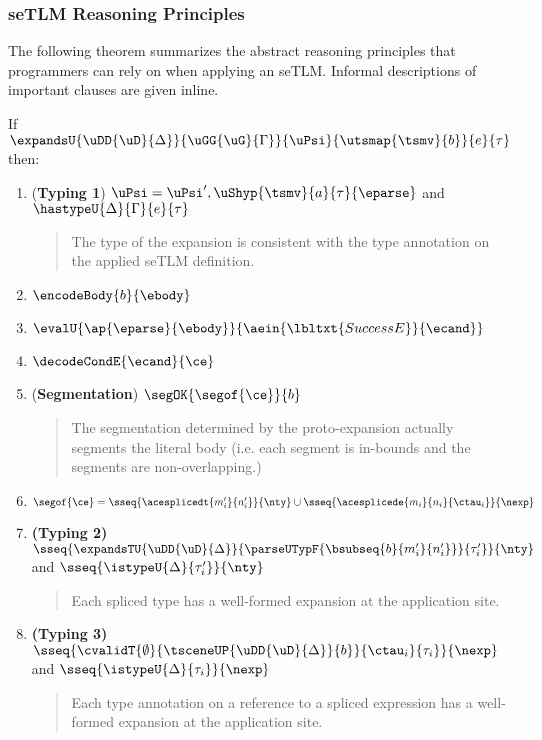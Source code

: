 \documentclass[acmsmall,10pt,review,anonymous]{acmart}\settopmatter{printfolios=true}
\begin{document}
\subsubsection{seTLM Reasoning Principles} 
The following theorem summarizes the abstract reasoning principles that programmers can rely on when applying an seTLM. Informal descriptions of important clauses are given inline. 
\begin{theorem}
If $\expandsU{\uDD{\uD}{\Delta}}{\uGG{\uG}{\Gamma}}{\uPsi}{\utsmap{\tsmv}{b}}{e}{\tau}$ then:
\begin{enumerate}[nolistsep]
\item (\textbf{Typing 1}) $\uPsi = \uPsi', \uShyp{\tsmv}{a}{\tau}{\eparse}$ and $\hastypeU{\Delta}{\Gamma}{e}{\tau}$
  \begin{quote}
     The type of the expansion is consistent with the type annotation on the applied seTLM definition.
  \end{quote}
\item $\encodeBody{b}{\ebody}$
\item $\evalU{\ap{\eparse}{\ebody}}{\aein{\lbltxt{SuccessE}}{\ecand}}$
\item $\decodeCondE{\ecand}{\ce}$
\item (\textbf{Segmentation}) $\segOK{\segof{\ce}}{b}$
        \begin{quote}
        The segmentation determined by the proto-expansion actually segments the literal body (i.e. each segment is in-bounds and the segments are non-overlapping.)
        \end{quote}
\item $\segof{\ce} = \sseq{\acesplicedt{m'_i}{n'_i}}{\nty} \cup \sseq{\acesplicede{m_i}{n_i}{\ctau_i}}{\nexp}$
\item \textbf{(Typing 2)} $\sseq{
      \expandsTU{\uDD{\uD}{\Delta}}
      {
        \parseUTypF{\bsubseq{b}{m'_i}{n'_i}}
      }{\tau'_i}
    }{\nty}$ and $\sseq{\istypeU{\Delta}{\tau'_i}}{\nty}$
      \begin{quote}
        Each spliced type has a well-formed expansion at the application site.
      \end{quote}
\item \textbf{(Typing 3)} $\sseq{
  \cvalidT{\emptyset}{
    \tsceneUP
      {\uDD
        {\uD}{\Delta}
      }{b}
  }{
    \ctau_i
  }{\tau_i}
}{\nexp}$ and $\sseq{\istypeU{\Delta}{\tau_i}}{\nexp}$
    \begin{quote}
      Each type annotation on a reference to a spliced expression has a well-formed expansion at the application site.

\end{quote}
\end{enumerate}
\end{theorem}
\end{document}
